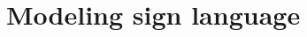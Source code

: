 \documentclass[10pt,twocolumn,letterpaper]{article}
\begin{document}
%
%
%
%


\section{Modeling sign language}
\end{document}
